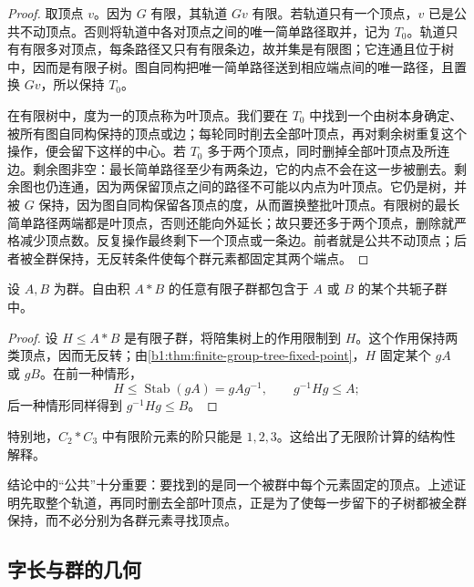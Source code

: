\begin{proof}
	取顶点 \(v\)。因为 \(G\) 有限，其轨道 \(Gv\) 有限。若轨道只有一个顶点，\(v\) 已是公共不动顶点。否则将轨道中各对顶点之间的唯一简单路径取并，记为 \(T_0\)。轨道只有有限多对顶点，每条路径又只有有限条边，故并集是有限图；它连通且位于树中，因而是有限子树。图自同构把唯一简单路径送到相应端点间的唯一路径，且置换 \(Gv\)，所以保持 \(T_0\)。

	在有限树中，度为一的顶点称为叶顶点。我们要在 \(T_0\) 中找到一个由树本身确定、被所有图自同构保持的顶点或边；每轮同时削去全部叶顶点，再对剩余树重复这个操作，便会留下这样的中心。若 \(T_0\) 多于两个顶点，同时删掉全部叶顶点及所连边。剩余图非空：最长简单路径至少有两条边，它的内点不会在这一步被删去。剩余图也仍连通，因为两保留顶点之间的路径不可能以内点为叶顶点。它仍是树，并被 \(G\) 保持，因为图自同构保留各顶点的度，从而置换整批叶顶点。有限树的最长简单路径两端都是叶顶点，否则还能向外延长；故只要还多于两个顶点，删除就严格减少顶点数。反复操作最终剩下一个顶点或一条边。前者就是公共不动顶点；后者被全群保持，无反转条件使每个群元素都固定其两个端点。
\end{proof}

\begin{corollary}\label{b1:cor:finite-subgroup-free-product}
	设 \(A,B\) 为群。自由积 \(A*B\) 的任意有限子群都包含于 \(A\) 或 \(B\) 的某个共轭子群中。
\end{corollary}

\begin{proof}
	设 \(H\le A*B\) 是有限子群，将陪集树上的作用限制到 \(H\)。这个作用保持两类顶点，因而无反转；由\cref{b1:thm:finite-group-tree-fixed-point}，\(H\) 固定某个 \(gA\) 或 \(gB\)。在前一种情形，
	\[
		H\le\operatorname{Stab}(gA)=gAg^{-1}, \qquad g^{-1}Hg\le A;
	\]
	后一种情形同样得到 \(g^{-1}Hg\le B\)。
\end{proof}

特别地，\(C_2*C_3\) 中有限阶元素的阶只能是 \(1,2,3\)。这给出了无限阶计算的结构性解释。

\ProseParagraphBreak
结论中的“公共”十分重要：要找到的是同一个被群中每个元素固定的顶点。上述证明先取整个轨道，再同时删去全部叶顶点，正是为了使每一步留下的子树都被全群保持，而不必分别为各群元素寻找顶点。

\subsection{字长与群的几何}
\label{b1:subsec:C02:03}

